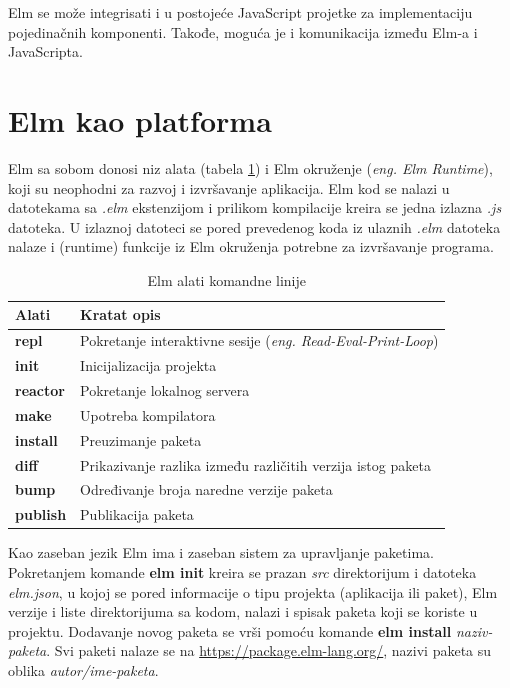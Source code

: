 \documentclass[12pt,oneside]{memoir}
\begin{document}
Elm se može integrisati i u postojeće JavaScript projetke za implementaciju pojedinačnih 
komponenti. Takođe, moguća je i komunikacija između Elm-a i JavaScripta. 

\section{Elm kao platforma}
Elm sa sobom donosi niz alata (tabela \ref{table:1}) i Elm okruženje (\emph{eng. Elm 
Runtime}), koji su neophodni za razvoj i izvršavanje aplikacija. Elm kod se nalazi u 
datotekama sa \emph{.elm} ekstenzijom i prilikom kompilacije kreira se jedna izlazna 
\emph{.js} datoteka. U izlaznoj datoteci se pored prevedenog koda iz ulaznih \emph{.elm} 
datoteka nalaze i (runtime) funkcije iz Elm okruženja potrebne za izvršavanje programa.


\begin{table}[h!]
\centering
\begin{tabular}{|l l|} 
 \hline 
 Alati & Kratat opis  \\ [0.5ex] 
 \hline
  \textbf{repl} & Pokretanje interaktivne sesije (\emph{eng. Read-Eval-Print-Loop}) \\ 
  \textbf{init} & Inicijalizacija projekta \\
  \textbf{reactor} & Pokretanje lokalnog servera \\
  \textbf{make} & Upotreba kompilatora \\
  \textbf{install}  & Preuzimanje paketa \\ 
  \textbf{diff} & Prikazivanje razlika između različitih verzija istog paketa \\
  \textbf{bump} & Određivanje broja naredne verzije paketa  \\
  \textbf{publish} & Publikacija paketa \\[1ex] 
 \hline
\end{tabular}
\caption{Elm alati komandne linije}
\label{table:1}
\end{table}

 
Kao zaseban jezik Elm ima i zaseban sistem za upravljanje paketima.
Pokretanjem komande \textbf{elm init} kreira se prazan \emph{src} direktorijum i 
datoteka \emph{elm.json}, u kojoj se pored informacije o tipu projekta (aplikacija ili 
paket), Elm verzije i liste direktorijuma sa kodom, nalazi i spisak paketa koji se 
koriste u projektu. Dodavanje novog paketa se vrši pomoću komande \textbf{elm install} 
\emph{naziv-paketa}. Svi paketi nalaze se na \url{https://package.elm-lang.org/}, nazivi 
paketa su oblika \emph{autor/ime-paketa}.
\end{document}

